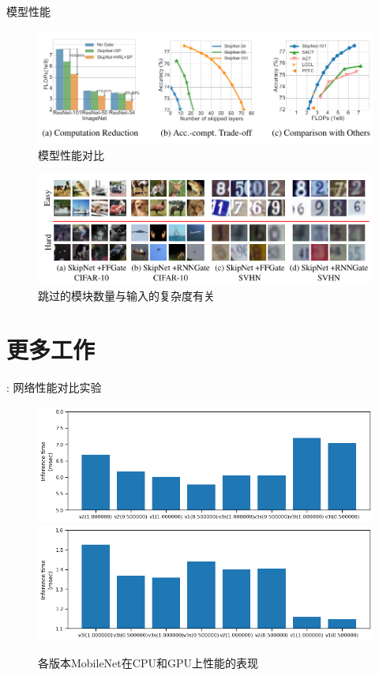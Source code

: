 \documentclass[UTF8, fontset=founder, aspectratio=43, 10pt, t]{ctexbeamer}
\begin{document}
\begin{frame}{模型性能}
	\begin{figure}
		\centering
		\includegraphics[width=0.7\linewidth]{Images/res}
		\caption{模型性能对比}
		\label{fig:res}
	\end{figure}
	\begin{figure}
		\centering
		\includegraphics[width=0.7\linewidth]{Images/difficult}
		\caption{跳过的模块数量与输入的复杂度有关}
		\label{fig:difficult}
	\end{figure}
	
\end{frame}

\section{更多工作}

\begin{frame}{\titleprefix: 网络性能对比实验}
	\begin{figure}
		\centering
		\includegraphics[width=0.7\linewidth]{Images/mobilenetcomp}
		\includegraphics[width=0.7\linewidth]{Images/mobilenetcompgpu}
		\caption{各版本MobileNet在CPU和GPU上性能的表现}
		\label{fig:mobilenetcomp}
	\end{figure}
	
\end{frame}
\end{document}
